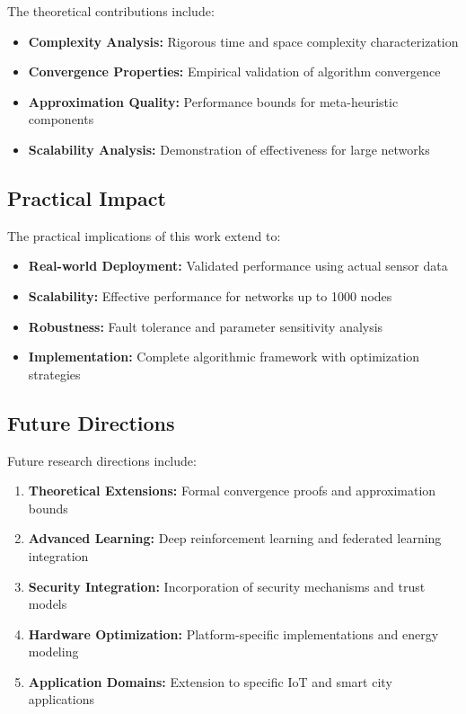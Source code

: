 \documentclass[conference]{IEEEtran}
\begin{document}
The theoretical contributions include:

\begin{itemize}
    \item \textbf{Complexity Analysis:} Rigorous time and space complexity characterization
    \item \textbf{Convergence Properties:} Empirical validation of algorithm convergence
    \item \textbf{Approximation Quality:} Performance bounds for meta-heuristic components
    \item \textbf{Scalability Analysis:} Demonstration of effectiveness for large networks
\end{itemize}

\subsection{Practical Impact}

The practical implications of this work extend to:

\begin{itemize}
    \item \textbf{Real-world Deployment:} Validated performance using actual sensor data
    \item \textbf{Scalability:} Effective performance for networks up to 1000 nodes
    \item \textbf{Robustness:} Fault tolerance and parameter sensitivity analysis
    \item \textbf{Implementation:} Complete algorithmic framework with optimization strategies
\end{itemize}

\subsection{Future Directions}

Future research directions include:

\begin{enumerate}
    \item \textbf{Theoretical Extensions:} Formal convergence proofs and approximation bounds
    \item \textbf{Advanced Learning:} Deep reinforcement learning and federated learning integration
    \item \textbf{Security Integration:} Incorporation of security mechanisms and trust models
    \item \textbf{Hardware Optimization:} Platform-specific implementations and energy modeling
    \item \textbf{Application Domains:} Extension to specific IoT and smart city applications
\end{enumerate}
\end{document}
